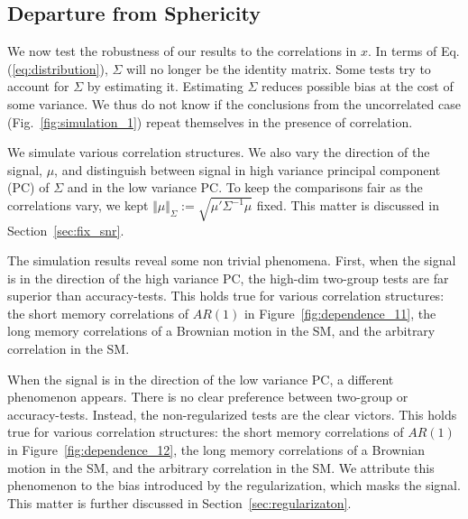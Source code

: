 \documentclass[]{bio}
\begin{document}
\subsection{Departure from Sphericity}
\label{sec:dependence}

We now test the robustness of our results to the correlations in $x$. 
In terms of Eq.(\ref{eq:distribution}), $\Sigma$ will no longer be the identity matrix. 
Some tests try to account for $\Sigma$ by estimating it. 
Estimating $\Sigma$ reduces possible bias at the cost of some variance. 
We thus do not know if the conclusions from the uncorrelated case (Fig.~\ref{fig:simulation_1}) repeat themselves in the presence of correlation. 

We simulate various correlation structures.
We also vary the direction of the signal, $\mu$, and distinguish between signal in high variance principal component (PC) of $\Sigma$ and in the low variance PC. 
To keep the comparisons fair as the correlations vary, we kept $\Vert \mu \Vert_\Sigma:=\sqrt{\mu'\Sigma^{-1}\mu}$ fixed.
This matter is discussed in Section~\ref{sec:fix_snr}.


The simulation results reveal some non trivial phenomena.
First, when the signal is in the direction of the high variance PC, the high-dim two-group tests are far superior than accuracy-tests. 
This holds true for various correlation structures: the short memory correlations of $AR(1)$ in Figure~\ref{fig:dependence_11}, the long memory correlations of a Brownian motion in the SM, and the arbitrary correlation in the SM.

When the signal is in the direction of the low variance PC, a different phenomenon appears.
There is no clear preference between two-group or accuracy-tests.
Instead, the non-regularized tests are the clear victors. 
This holds true for various correlation structures: the short memory correlations of $AR(1)$ in Figure~\ref{fig:dependence_12}, the long memory correlations of a Brownian motion in the SM, and the arbitrary correlation in the SM.
We attribute this phenomenon to the bias introduced by the regularization, which masks the signal.
This matter is further discussed in Section~\ref{sec:regularizaton}.
\end{document}
